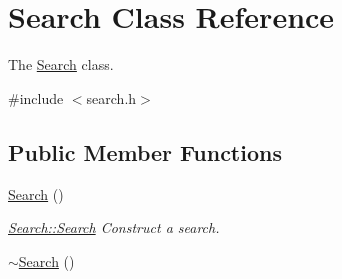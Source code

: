 \hypertarget{classSearch}{\section{Search Class Reference}
\label{classSearch}
}


The \hyperlink{classSearch}{Search} class.  




{\ttfamily \#include $<$search.\+h$>$}

\subsection*{Public Member Functions}
\begin{DoxyCompactItemize}
\item 
\hypertarget{classSearch_af629e7254d367d2b2cacfb0699c9de31}{\hyperlink{classSearch_af629e7254d367d2b2cacfb0699c9de31}{Search} ()}\label{classSearch_af629e7254d367d2b2cacfb0699c9de31}

\begin{DoxyCompactList}\small\item\em \hyperlink{classSearch_af629e7254d367d2b2cacfb0699c9de31}{Search\+::\+Search} Construct a search. \end{DoxyCompactList}\item 
\hypertarget{classSearch_afd7e16f7369d7a44189e530292b5faa0}{\hyperlink{classSearch_afd7e16f7369d7a44189e530292b5faa0}{$\sim$\+Search} ()}\label{classSearch_afd7e16f7369d7a44189e530292b5faa0}


\end{DoxyCompactItemize}
